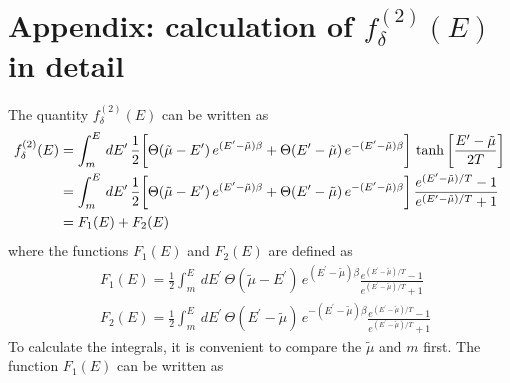 \documentclass[sn-mathphys,Numbered]{sn-jnl}
\theoremstyle{thmstyleone}%
\theoremstyle{thmstyletwo}%
\theoremstyle{thmstylethree}%
\begin{document}
\section{Appendix: calculation of $f^{(2)}_\delta(E)$ in detail}
The quantity $f^{(2)}_\delta(E)$ can be written as
\begin{align}
\label{f_delta}
f^{(2)}_\delta(E)&=\int^{E}_{m}\,dE^\prime\,\frac{1}{2}\bigg[\Theta(\tilde\mu-E^\prime)\,e^{(E^\prime-\tilde\mu)\beta}+\Theta(E^\prime-\tilde\mu)\,e^{-(E^\prime-\tilde\mu)\beta}\bigg]\,\tanh\bigg[\frac{E^\prime-\tilde\mu}{2T}\bigg]\notag\\
&=\int^{E}_{m}\,dE^\prime\,\frac{1}{2}\bigg[\Theta(\tilde\mu-E^\prime)\,e^{(E^\prime-\tilde\mu)\beta}+\Theta(E^\prime-\tilde\mu)\,e^{-(E^\prime-\tilde\mu)\beta}\bigg]\,\frac{e^{(E^\prime-\tilde\mu)/T}-1}{e^{(E^\prime-\tilde\mu)/T}+1}\notag\\
&=F_1(E)+F_2(E)
\end{align}
where the functions $F_1(E)$ and $F_2(E)$ are defined as
\begin{align}
&F_1(E)=\frac{1}{2}\int^{E}_{m}\,dE^\prime\,\Theta(\tilde\mu-E^\prime)\,e^{(E^\prime-\tilde\mu)\beta}\frac{e^{(E^\prime-\tilde\mu)/T}-1}{e^{(E^\prime-\tilde\mu)/T}+1}\\
&F_2(E)=\frac{1}{2}\int^{E}_{m}\,dE^\prime\,\Theta(E^\prime-\tilde\mu)\,e^{-(E^\prime-\tilde\mu)\beta}\frac{e^{(E^\prime-\tilde\mu)/T}-1}{e^{(E^\prime-\tilde\mu)/T}+1}
\end{align}
To calculate the integrals, it is convenient to compare the $\tilde\mu$ and $m$ first. The function $F_1(E)$ can be written as
\end{document}
